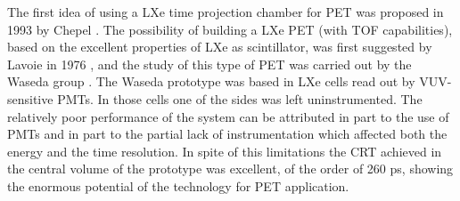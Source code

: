 \documentclass[review]{elsarticle}
\begin{document}
The first idea of using a LXe time projection chamber for PET was proposed in 1993 by Chepel \cite{chepelFirst}. 
%
The possibility of building a LXe PET (with TOF capabilities), based on the excellent properties of LXe as scintillator, was first suggested by Lavoie in 1976 \cite{lavoie}, and the study of this type of PET was carried out by the Waseda group \cite{Doke1,Nishikido2,Nishikido1}. The Waseda prototype was based in LXe cells read out by VUV-sensitive PMTs. In those cells one of the sides was left uninstrumented. The relatively poor performance of the system can be attributed in part to the use of PMTs and in part to the partial lack of instrumentation which affected both the energy and the time resolution. In spite of this limitations 
the CRT achieved in the central volume of the prototype was excellent, of the order of 260 ps, showing the enormous potential of the technology for PET application. 
\end{document}
